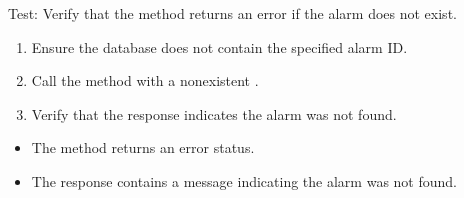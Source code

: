 \documentclass[letterpaper,10pt,english]{sphinxmanual}
\begin{document}
\begin{fulllineitems}
\label{\detokenize{test:test.test_alarm.test_update_alarm_end_date_not_found}}
\pysigstartsignatures
\pysiglinewithargsret
{}
{}
{}
\pysigstopsignatures
\sphinxAtStartPar
Test: Verify that the method returns an error if the alarm does not exist.
\begin{description}
\begin{enumerate}
%
\item {} 
\sphinxAtStartPar
Ensure the database does not contain the specified alarm ID.

\item {} 
\sphinxAtStartPar
Call the  method with a non\sphinxhyphen{}existent .

\item {} 
\sphinxAtStartPar
Verify that the response indicates the alarm was not found.

\end{enumerate}

\begin{itemize}
\item {} 
\sphinxAtStartPar
The method returns an error status.

\item {} 
\sphinxAtStartPar
The response contains a message indicating the alarm was not found.

\end{itemize}

\end{description}

\end{fulllineitems}

\end{document}
